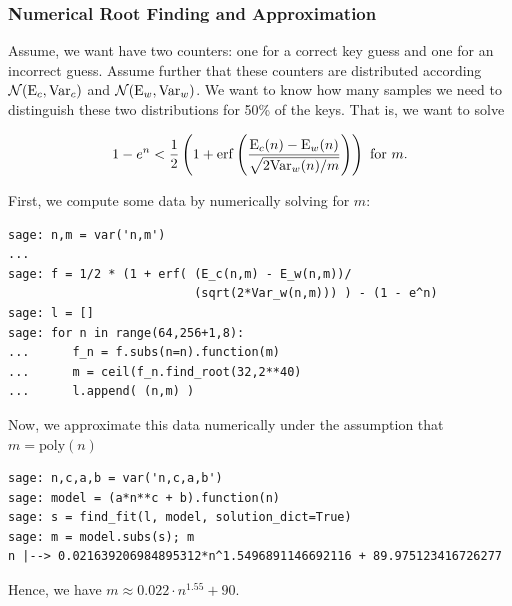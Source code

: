 \documentclass[10pt]{beamer}
\newcommand{\E}{\ensuremath{\textnormal{E}}}
\newcommand{\Var}{\ensuremath{\textnormal{Var}}}
\DeclareMathOperator{\erf}{erf}
\begin{document}
\begin{frame}
\frametitle{Numerical Root Finding and Approximation}

Assume, we want have two counters: one for a correct key guess and one for an incorrect guess. Assume further that these counters are distributed according $\mathcal{N}(\E_c,\Var_c)$ and $\mathcal{N}(\E_w,\Var_w)$. We want to know how many samples we need to distinguish these two distributions for 50\% of the keys. That is, we want to solve

$$1-e^n < \frac{1}{2}\left(1+\erf\left(\frac{\E_c(n) -\E_w(n)}{\sqrt{2 \Var_w(n)/m}} \right)\right) \mbox{ for } m.$$

\framebreak

First, we compute some data by numerically solving for $m$:

\begin{lstlisting}
sage: n,m = var('n,m')
...
sage: f = 1/2 * (1 + erf( (E_c(n,m) - E_w(n,m))/
                          (sqrt(2*Var_w(n,m))) ) - (1 - e^n)
sage: l = []
sage: for n in range(64,256+1,8):
...      f_n = f.subs(n=n).function(m)
...      m = ceil(f_n.find_root(32,2**40)
...      l.append( (n,m) )
\end{lstlisting}

\framebreak

Now, we approximate this data numerically under the assumption that $m = \mathrm{poly}(n)$

\begin{lstlisting}
sage: n,c,a,b = var('n,c,a,b')
sage: model = (a*n**c + b).function(n)
sage: s = find_fit(l, model, solution_dict=True)
sage: m = model.subs(s); m
n |--> 0.021639206984895312*n^1.5496891146692116 + 89.975123416726277
\end{lstlisting}

Hence, we have $m \approx 0.022 \cdot n^{1.55} + 90.$

\end{frame}
\end{document}
